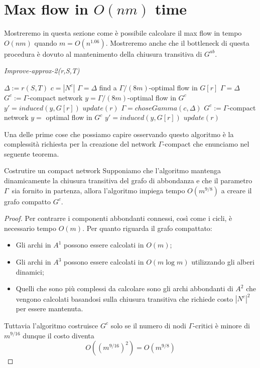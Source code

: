 \documentclass[a4paper, 11pt]{report}
\newcommand{\gmm}{$\Gamma$}
\begin{document}
\section{Max flow in $O(nm)$ time}

Mostreremo in questa sezione come è possibile calcolare il max flow in tempo $O(nm)$ quando $m = O(n^{1.06})$.
Mostreremo anche che il bottleneck di questa procedura è dovuto al mantenimento della chiusura transitiva di $G^{ab}$.


\begin{algorithm}
\caption{\textit{Improve-approx-2(r,S,T)}}
\label{imp2}
\begin{algorithmic}[1]
\State $\Delta := r(S,T)$
\State $c = |N^c|$
    \State $\Gamma = \Delta$
    \State find a $\Gamma/(8m)$-optimal flow in $G[r]$
    \State $\Gamma = \Delta$
    \State $G^c:= \Gamma$-compact network
    \State $y=\Gamma/(8m)$-optimal flow in $G^c$
    \State $y' = induced(y, G[r])$
    \State $update(r)$
    $\Gamma = choseGamma(c, \Delta)$
    \State $G^c:= \Gamma$-compact network
    \State $y=$ optimal flow in $G^c$
    \State $y' = induced(y, G[r])$
    \State $update(r)$
\EndIf
\end{algorithmic}
\end{algorithm}
Una delle prime cose che possiamo capire osservando questo algoritmo è la complessità richiesta per la creazione del network \gmm-compact che enunciamo nel seguente teorema.
\begin{theo}[label = tgcomp]{Costrutire un compact network}{}
    Supponiamo che l'algoritmo mantenga dinamicamente la chiusura transitiva del grafo di abbondanza e 
    che il parametro \gmm\ sia fornito in partenza, allora
    l'algoritmo impiega tempo $O(m^{9/8})$ a creare il grafo compatto $G^c$.
\end{theo}
\begin{proof}
    Per contrarre i componenti abbondanti connessi, così come i cicli, è necessario tempo $O(m)$.
    Per quanto riguarda il grafo compattato: 
    \begin{itemize}
        \item Gli archi in $A^1$ possono essere calcolati in $O(m)$; 
        \item Gli archi in $A^3$ possono essere calcolati in $O(m\log m)$ utilizzando gli alberi dinamici;
        \item Quelli che sono più complessi da calcolare sono gli archi abbondanti di $A^2$ che vengono calcolati basandosi sulla chiusura transitiva che richiede costo ${|N^c|}^2$ per essere mantenuta.
    \end{itemize}
    Tuttavia l'algoritmo costruisce $G^c$ solo se il numero di nodi \gmm-critici è minore di $m^{9/16}$ dunque il costo diventa
    \[O((m^{9/16})^2) = O(m^{9/8})\]
\end{proof}
\end{document}
